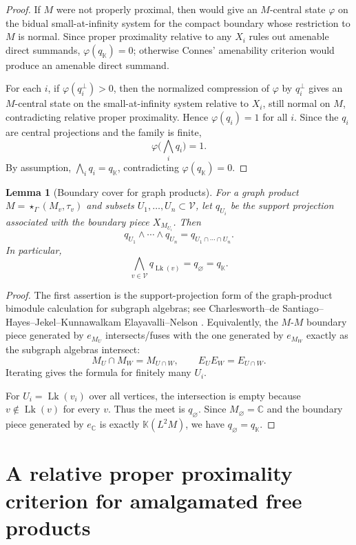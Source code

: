 \documentclass[11pt]{amsart}
\newtheorem{lemma}[theorem]{Lemma}
\theoremstyle{definition}
\newcommand{\V}{\mathcal V}
\newcommand{\Lk}{\operatorname{Lk}}
\newcommand{\K}{\mathbb K}
\newcommand{\C}{\mathbb C}
\begin{document}
\begin{proof}
If $M$ were not properly proximal, then \cite[Theorem 8.5]{DKEP} would give an $M$-central state $\varphi$ on the bidual small-at-infinity system for the compact boundary whose restriction to $M$ is normal.  Since proper proximality relative to any $X_i$ rules out amenable direct summands, $\varphi(q_{\K})=0$; otherwise Connes' amenability criterion would produce an amenable direct summand.

For each $i$, if $\varphi(q_i^\perp)>0$, then the normalized compression of $\varphi$ by $q_i^\perp$ gives an $M$-central state on the small-at-infinity system relative to $X_i$, still normal on $M$, contradicting relative proper proximality.  Hence $\varphi(q_i)=1$ for all $i$.  Since the $q_i$ are central projections and the family is finite,
\[
\varphi\Big(\bigwedge_i q_i\Big)=1.
\]
By assumption, $\bigwedge_i q_i=q_{\K}$, contradicting $\varphi(q_{\K})=0$.
\end{proof}

\begin{lemma}[Boundary cover for graph products]\label{lem:boundary-cover}
For a graph product $M=\star_{\Gamma}(M_v,\tau_v)$ and subsets $U_1,\dots,U_n\subset \V$, let $q_{U_i}$ be the support projection associated with the boundary piece $X_{M_{U_i}}$.  Then
\[
q_{U_1}\wedge\cdots\wedge q_{U_n}=q_{U_1\cap\cdots\cap U_n}.
\]
In particular,
\[
\bigwedge_{v\in \V} q_{\Lk(v)}=q_\varnothing=q_{\K}.
\]
\end{lemma}

\begin{proof}
The first assertion is the support-projection form of the graph-product bimodule calculation for subgraph algebras; see Charlesworth--de Santiago--Hayes--Jekel--Kunnawalkam Elayavalli--Nelson \cite[Theorem 0.4, Theorem 5.4, and Proposition 5.5]{CDHJKEN}.  Equivalently, the $M$-$M$ boundary piece generated by $e_{M_U}$ intersects/fuses with the one generated by $e_{M_W}$ exactly as the subgraph algebras intersect:
\[
M_U\cap M_W=M_{U\cap W},
\qquad
E_U E_W=E_{U\cap W}.
\]
Iterating gives the formula for finitely many $U_i$.

For $U_i=\Lk(v_i)$ over all vertices, the intersection is empty because $v\notin \Lk(v)$ for every $v$.  Thus the meet is $q_\varnothing$.  Since $M_\varnothing=\C$ and the boundary piece generated by $e_{\C}$ is exactly $\K(L^2M)$, we have $q_\varnothing=q_{\K}$.
\end{proof}

\section{A relative proper proximality criterion for amalgamated free products}
\end{document}
